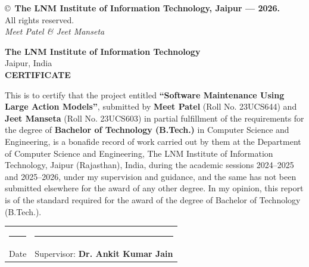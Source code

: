 \documentclass[12pt,a4paper]{report}
\begin{document}
\newpage
\thispagestyle{empty}
\vspace*{\fill}
\begin{center}
    \copyright\ \textbf{The LNM Institute of Information Technology, Jaipur --- 2026.}\\
    All rights reserved.\\[0.8cm]
    \textit{Meet Patel \quad \& \quad Jeet Manseta}
\end{center}
\vspace*{2cm}

\newpage
\thispagestyle{empty}
\begin{center}
    {\Large \textbf{The LNM Institute of Information Technology}}\\[0.2cm]
    {\large Jaipur, India}\\[1.5cm]
    {\Large \textbf{CERTIFICATE}}\\[1.2cm]
\end{center}

\noindent This is to certify that the project entitled \textbf{``Software Maintenance Using Large Action Models''}, submitted by \textbf{Meet Patel} (Roll No. 23UCS644) and \textbf{Jeet Manseta} (Roll No. 23UCS603) in partial fulfillment of the requirements for the degree of \textbf{Bachelor of Technology (B.Tech.)} in Computer Science and Engineering, is a bonafide record of work carried out by them at the Department of Computer Science and Engineering, The LNM Institute of Information Technology, Jaipur (Rajasthan), India, during the academic sessions 2024--2025 and 2025--2026, under my supervision and guidance, and the same has not been submitted elsewhere for the award of any other degree. In my opinion, this report is of the standard required for the award of the degree of Bachelor of Technology (B.Tech.).

\vspace{3.5cm}

\noindent
\begin{tabular*}{\textwidth}{@{\extracolsep{\fill}}lr}
    \rule{5cm}{0.4pt} & \rule{6.5cm}{0.4pt} \\
    Date & Supervisor: \textbf{Dr. Ankit Kumar Jain}
\end{tabular*}

\newpage
{}
\setcounter{page}{4}
\end{document}
